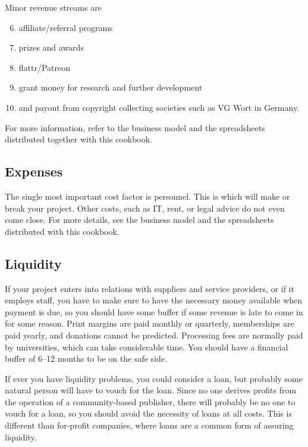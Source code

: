 \documentclass[guidelines,nonflat,modfonts] {langsci/langscibook}
\begin{document}
\noindent 
Minor revenue streams are 
\begin{enumerate}
\setcounter{enumi}{5}
 \item affiliate/referral programs
 \item prizes and awards
 \item flattr/Patreon
 \item  grant money for research and further development
 \item and payout from copyright collecting societies such as VG Wort in Germany. 
\end{enumerate}
 
For more information, refer to the business model and the spreadsheets distributed together with this cookbook. 

\subsection{Expenses}
The single most important cost factor is personnel.  This is which will make or break your project. Other costs, such as IT, rent, or legal advice do not even come close. For more details, see the business model and the spreadsheets distributed with this cookbook. 

\subsection{Liquidity}
If your project enters into relations with suppliers and service providers, or if it employs staff, you have to make sure to have the necessary money available when payment is due, so you should have some buffer if some revenue is late to come in for some reason. Print margins are paid monthly or quarterly, memberships are paid yearly, and donations cannot be predicted. Processing fees are normally paid by universities, which can take considerable time. You should have a financial buffer of 6--12 months to be on the safe side. 

If ever you have liquidity problems, you could consider a loan, but probably some natural person will have to vouch for the loan. Since no one derives profits from the operation of a community-based publisher, there will probably be no one to vouch for a loan, so you should avoid the necessity of loans at all costs. This is different than for-profit companies, where loans are a common form of assuring liquidity. 
   
\end{document}
